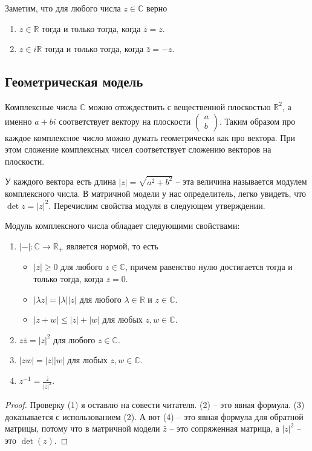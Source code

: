 Заметим, что для любого числа $z\in\mathbb C$ верно
\begin{enumerate}
\item $z\in \mathbb R$ тогда и только тогда, когда $\bar z= z$.

\item $z\in i\mathbb R$ тогда и только тогда, когда $\bar z = - z$.
\end{enumerate}

\subsection{Геометрическая модель}

Комплексные числа $\mathbb C$ можно отождествить с вещественной плоскостью $\mathbb R^2$, а именно $a+bi$ соответствует вектору на плоскости $\left(\begin{smallmatrix}a\\b\end{smallmatrix}\right)$.
Таким образом про каждое комплексное число можно думать геометрически как про вектора.
При этом сложение комплексных чисел соответствует сложению векторов на плоскости.

У каждого вектора есть длина $|z| = \sqrt{a^2 + b^2}$ -- эта величина называется модулем комплексного числа.
В матричной модели у нас определитель, легко увидеть, что $\det z = |z|^2$.
Перечислим свойства модуля в следующем утверждении.

\begin{claim*}
Модуль комплексного числа обладает следующими свойствами:
\begin{enumerate}
\item $|{-}|\colon \mathbb C\to \mathbb R_+$ является нормой, то есть 
\begin{itemize}
\item $|z| \geqslant 0$ для любого $z\in\mathbb C$, причем равенство нулю достигается тогда и только тогда, когда $z = 0$.

\item $|\lambda z| = |\lambda | |z|$ для любого $\lambda \in \mathbb R$ и $z\in\mathbb C$.

\item $|z + w|\leqslant |z| + |w|$ для любых $z,w\in\mathbb C$.
\end{itemize}

\item $z\bar z = |z|^2$ для любого $z\in\mathbb C$.

\item $|zw| = |z| |w|$ для любых $z,w\in\mathbb C$.

\item $z^{-1} = \frac{\bar z}{|z|^2}$.
\end{enumerate}
\end{claim*}
\begin{proof}
Проверку (1) я оставлю на совести читателя.
(2) -- это явная формула.
(3) доказывается с использованием (2).
А вот (4) -- это явная формула для обратной матрицы, потому что в матричной модели $\bar z$ -- это сопряженная матрица, а $|z|^2$ -- это $\det (z)$.
\end{proof}

